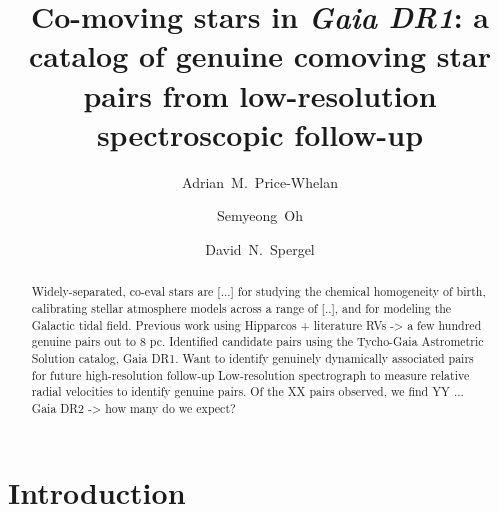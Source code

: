 \documentclass[modern, letterpaper]{aastex61}
\begin{document}
\title{Co-moving stars in \textsl{Gaia DR1}:
       a catalog of genuine comoving star pairs from low-resolution
       spectroscopic follow-up}

\author{Adrian~M.~Price-Whelan}

\author{Semyeong~Oh}

\author{David~N.~Spergel}



\begin{abstract}
Widely-separated, co-eval stars are [...] for studying the chemical homogeneity
of birth, calibrating stellar atmosphere models across a range of [..], and for
modeling the Galactic tidal field.
Previous work using Hipparcos + literature RVs -> a few hundred genuine pairs
out to 8 pc.
Identified candidate pairs using the Tycho-Gaia Astrometric Solution catalog,
Gaia DR1.
Want to identify genuinely dynamically associated pairs for future
high-resolution follow-up
Low-resolution spectrograph to measure relative radial velocities to identify
genuine pairs.
Of the XX pairs observed, we find YY ...
Gaia DR2 -> how many do we expect?
\end{abstract}


\section{Introduction}\label{sec:introduction}
\end{document}
